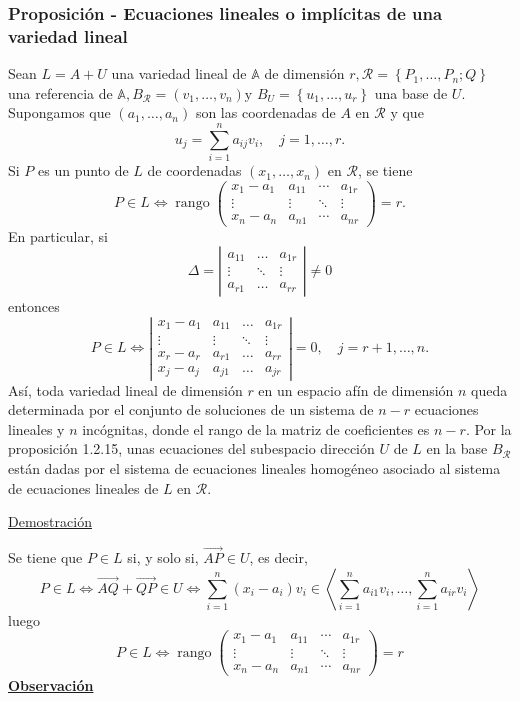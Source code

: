 \documentclass[12pt, a4paper, ones, notitlepage, openany,titlepage]{article}
\newcommand{\demostracion}{\noindent\underline{Demostración}}
\newcommand{\observacion}{\noindent\underline{\textbf{Observación}}}
\begin{document}
\subsubsection{Proposición - Ecuaciones lineales o implícitas de una variedad lineal}
Sean $L=A+U$ una variedad lineal de $\mathbb{A}$ de dimensión $r, \mathcal{R}=\left\{P_{1}, \ldots, P_{n} ; Q\right\}$ una referencia de $\mathbb{A}, B_{\mathcal{R}}=\left(v_{1}, \ldots, v_{n}\right) \mathrm{y}$ $B_{U}=\left\{u_{1}, \ldots, u_{r}\right\}$ una base de $U$. Supongamos que $\left(a_{1}, \ldots, a_{n}\right)$ son las coordenadas de $A$ en $\mathcal{R}$ y que
$$
u_{j}=\sum_{i=1}^{n} a_{i j} v_{i}, \quad j=1, \ldots, r .
$$
\noindent Si $P$ es un punto de $L$ de coordenadas $\left(x_{1}, \ldots, x_{n}\right)$ en $\mathcal{R}$, se tiene
$$
P \in L \Longleftrightarrow \operatorname{rango}\left(\begin{array}{cccc}
x_{1}-a_{1} & a_{11} & \cdots & a_{1 r} \\
\vdots & \vdots & \ddots & \vdots \\
x_{n}-a_{n} & a_{n 1} & \cdots & a_{n r}
\end{array}\right)=r .
$$
\noindent En particular, si
$$
\Delta=\left|\begin{array}{ccc}
a_{11} & \ldots & a_{1 r} \\
\vdots & \ddots & \vdots \\
a_{r 1} & \ldots & a_{r r}
\end{array}\right| \neq 0
$$
\noindent entonces
$$
P \in L \Longleftrightarrow\left|\begin{array}{rrrr}
x_{1}-a_{1} & a_{11} & \ldots & a_{1 r} \\
\vdots & \vdots & \ddots & \vdots \\
x_{r}-a_{r} & a_{r 1} & \ldots & a_{r r} \\
x_{j}-a_{j} & a_{j 1} & \ldots & a_{j r}
\end{array}\right|=0, \quad j=r+1, \ldots, n .
$$
\noindent Así, toda variedad lineal de dimensión $r$ en un espacio afín de dimensión $n$ queda determinada por el conjunto de soluciones de un sistema de $n-r$ ecuaciones lineales y $n$ incógnitas, donde el rango de la matriz de coeficientes es $n-r$. Por la proposición 1.2.15, unas ecuaciones del subespacio dirección $U$ de $L$ en la base $B_{\mathcal{R}}$ están dadas por el sistema de ecuaciones lineales homogéneo asociado al sistema de ecuaciones lineales de $L$ en $\mathcal{R}$.

\demostracion

\noindent Se tiene que $P \in L$ si, y solo si, $\overrightarrow{A P} \in U$, es decir,
$$
P \in L \Longleftrightarrow \overrightarrow{A Q}+\overrightarrow{Q P} \in U \Longleftrightarrow \sum_{i=1}^{n}\left(x_{i}-a_{i}\right) v_{i} \in\left\langle\sum_{i=1}^{n} a_{i 1} v_{i}, \ldots, \sum_{i=1}^{n} a_{i r} v_{i}\right\rangle
$$
\noindent luego
$$
P \in L \Longleftrightarrow \operatorname{rango}\left(\begin{array}{cccc}
x_{1}-a_{1} & a_{11} & \cdots & a_{1 r} \\
\vdots & \vdots & \ddots & \vdots \\
x_{n}-a_{n} & a_{n 1} & \cdots & a_{n r}
\end{array}\right)=r
$$
\observacion
\end{document}
